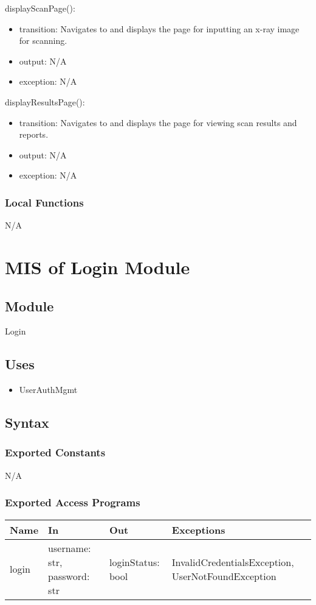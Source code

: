 \documentclass[12pt, titlepage]{article}
\begin{document}
\noindent displayScanPage():
\begin{itemize}
\item transition: Navigates to and displays the page for inputting an x-ray image for scanning.
\item output: N/A
\item exception: N/A
\end{itemize}

\noindent displayResultsPage():
\begin{itemize}
\item transition: Navigates to and displays the page for viewing scan results and reports.
\item output: N/A 
\item exception: N/A
\end{itemize}

\subsubsection{Local Functions}
N/A
\newpage

\section{MIS of Login Module} \label{Module} 
\subsection{Module}
Login
\subsection{Uses}
\begin{itemize}
    \item UserAuthMgmt
\end{itemize}
\subsection{Syntax}

\subsubsection{Exported Constants}
N/A
\subsubsection{Exported Access Programs}

\begin{center}
\begin{tabular}{p{2cm} p{5cm} p{4cm} p{5cm}}
\hline
\textbf{Name} & \textbf{In} & \textbf{Out} & \textbf{Exceptions} \\
\hline
login & username: str, password: str & loginStatus: bool & InvalidCredentialsException, UserNotFoundException \\
\hline
\end{tabular}
\end{center}
\end{document}
